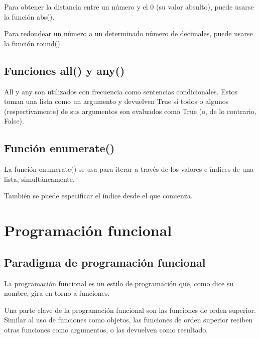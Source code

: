 \documentclass{report}
\begin{document}

Para obtener la distancia entre un número y el 0 (su valor absulto), puede usarse la función abs().


Para redondear un número a un determinado número de decimales, puede usarse la función round().


\section{Funciones all() y any()}

All y any son utilizados con frecuencia como sentencias condicionales. Estos toman una lista como un argumento y devuelven True si todos o algunos (respectivamente) de sus argumentos son evaluados como True (o, de lo contrario, False).



\section{Función enumerate()}

La función enumerate() se usa para iterar a través de los valores e índices de una lista, simultáneamente.


También se puede especificar el índice desde el que comienza.


\clearpage\chapter{Programación funcional}

\section{Paradigma de programación funcional}

La programación funcional es un estilo de programación que, como dice su nombre, gira en torno a funciones.

Una parte clave de la programación funcional son las funciones de orden superior. Similar al uso de funciones como objetos, las funciones de orden superior reciben otras funciones como argumentos, o las devuelven como resultado.
\end{document}
